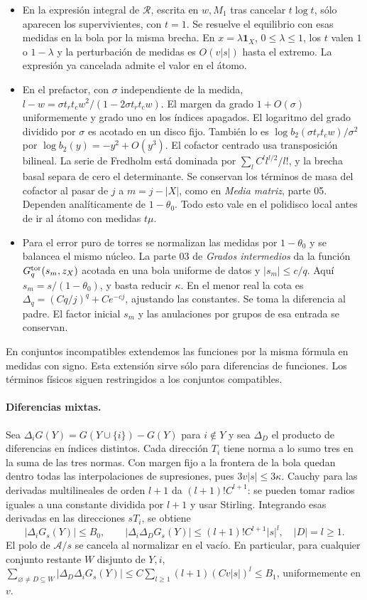 \begin{itemize}
\item En la expresión integral de $\mathcal R$, escrita en $w,M_1$ tras cancelar
$t\log t$, sólo aparecen los supervivientes, con $t=1$. Se resuelve el equilibrio con
esas medidas en la bola por la misma brecha. En $x=\lambda\mathbf1_X$,
$0\le\lambda\le1$, los $t$ valen $1$ o $1-\lambda$ y la perturbación de medidas es
$O(v|s|)$ hasta el extremo. La expresión ya cancelada admite el valor en el átomo.
\item En el prefactor, con $\sigma$ independiente de la medida,
$l-w=\sigma t_rt_c w^2/(1-2\sigma t_rt_c w)$. El margen da grado $1+O(\sigma)$
uniformemente y grado uno en los índices apagados. El logaritmo del grado dividido
por $\sigma$ es acotado en un disco fijo. También lo es
$\log b_2(\sigma t_rt_c w)/\sigma^2$ por $\log b_2(y)=-y^2+O(y^3)$.
El cofactor centrado usa transposición bilineal. La serie de Fredholm está dominada
por $\sum_l C^l l^{l/2}/l!$, y la brecha basal separa de cero el determinante.
Se conservan los términos de masa del cofactor al pasar de $j$ a $m=j-|X|$,
como en \emph{Media matriz}, parte 05. Dependen analíticamente de $1-\theta_0$.
Todo esto vale en el polidisco local antes de ir al átomo con medidas $t\mu$.
\item Para el error puro de torres se normalizan las medidas por $1-\theta_0$ y
se balancea el mismo núcleo. La parte 03 de \emph{Grados intermedios} da la función
$G_q^{\rm tor}(s_m,z_X)$ acotada en una bola uniforme de datos y $|s_m|\le c/q$.
Aquí $s_m=s/(1-\theta_0)$, y basta reducir $\kappa$. En el menor real la cota es
$\Delta_q=(Cq/j)^q+Ce^{-cj}$, ajustando las constantes. Se toma la diferencia al
padre. El factor inicial $s_m$ y las anulaciones por grupos de esa entrada se conservan.
\end{itemize}
En conjuntos incompatibles extendemos las funciones por la misma fórmula en medidas
con signo. Esta extensión sirve sólo para diferencias de funciones. Los términos
físicos siguen restringidos a los conjuntos compatibles.
\paragraph{Diferencias mixtas.}
Sea $\Delta_iG(Y)=G(Y\cup\{i\})-G(Y)$ para $i\notin Y$ y sea $\Delta_D$ el
producto de diferencias en índices distintos. Cada dirección $T_i$ tiene norma
a lo sumo tres en la suma de las tres normas. Con margen fijo a la frontera de la
bola quedan dentro todas las interpolaciones de supresiones, pues $3v|s|\le3\kappa$.
Cauchy para las derivadas multilineales de orden $l+1$ da $(l+1)!C^{l+1}$:
se pueden tomar radios iguales a una constante dividida por $l+1$ y usar Stirling.
Integrando esas derivadas en las direcciones $sT_i$, se obtiene
\[
 |\Delta_iG_s(Y)|\le B_0,\qquad
 |\Delta_i\Delta_DG_s(Y)|\le(l+1)! C^{l+1}|s|^l,\quad |D|=l\ge1 .
\]
El polo de $\mathscr A/s$ se cancela al normalizar en el vacío. En particular,
para cualquier conjunto restante $W$ disjunto de $Y,i$,
$\sum_{\varnothing\ne D\subseteq W}|\Delta_D\Delta_i G_s(Y)|
\le C\sum_{l\ge1}(l+1)(Cv|s|)^l\le B_1$, uniformemente en $v$.
